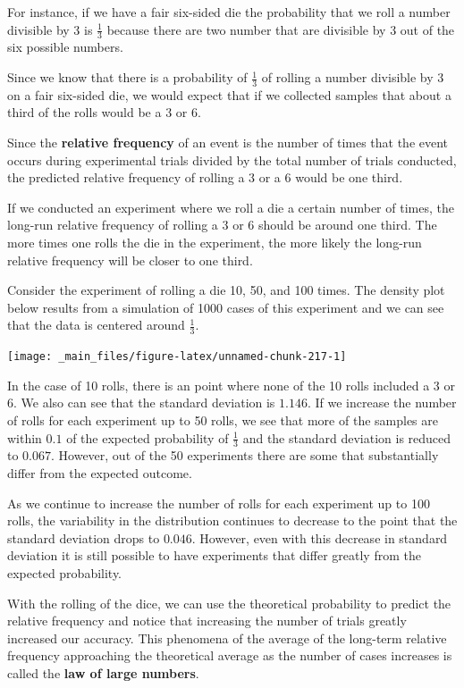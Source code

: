 \documentclass[
]{book}
\theoremstyle{definition}
\theoremstyle{definition}
\theoremstyle{definition}
\theoremstyle{definition}
\theoremstyle{remark}
\begin{document}
For instance, if we have a fair six-sided die the probability that we roll a number divisible by 3 is \(\frac{1}{3}\) because there are two number that are divisible by 3 out of the six possible numbers.

Since we know that there is a probability of \(\frac{1}{3}\) of rolling a number divisible by 3 on a fair six-sided die, we would expect that if we collected samples that about a third of the rolls would be a \(3\) or \(6\).

Since the \textbf{relative frequency} of an event is the number of times that the event occurs during experimental trials divided by the total number of trials conducted, the predicted relative frequency of rolling a \(3\) or a \(6\) would be one third.

If we conducted an experiment where we roll a die a certain number of times, the long-run relative frequency of rolling a 3 or 6 should be around one third. The more times one rolls the die in the experiment, the more likely the long-run relative frequency will be closer to one third.

Consider the experiment of rolling a die 10, 50, and 100 times. The density plot below results from a simulation of 1000 cases of this experiment and we can see that the data is centered around \(\frac{1}{3}\).

\begin{center}\texttt{[image: \_main\_files/figure-latex/unnamed-chunk-217-1]} \end{center}

In the case of 10 rolls, there is an point where none of the 10 rolls included a 3 or 6. We also can see that the standard deviation is \(1.146\). If we increase the number of rolls for each experiment up to 50 rolls, we see that more of the samples are within \(0.1\) of the expected probability of \(\frac{1}{3}\) and the standard deviation is reduced to \(0.067\). However, out of the 50 experiments there are some that substantially differ from the expected outcome.

As we continue to increase the number of rolls for each experiment up to 100 rolls, the variability in the distribution continues to decrease to the point that the standard deviation drops to \(0.046\). However, even with this decrease in standard deviation it is still possible to have experiments that differ greatly from the expected probability.

With the rolling of the dice, we can use the theoretical probability to predict the relative frequency and notice that increasing the number of trials greatly increased our accuracy. This phenomena of the average of the long-term relative frequency approaching the theoretical average as the number of cases increases is called the \textbf{law of large numbers}.
\end{document}
